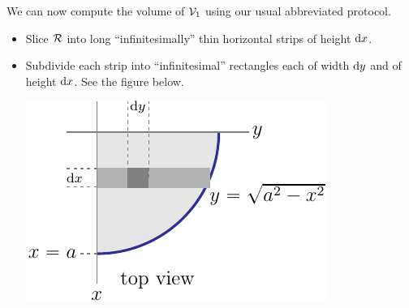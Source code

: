 \begin{eg}[Volume]
We can now compute the volume of $\mathcal{V}_1$ using our usual abbreviated
protocol.
\begin{itemize}
\item
   Slice $\mathcal{R}$ into long ``infinitesimally'' thin 
   horizontal strips of height $\mathrm{d}x$.
\item
   Subdivide each strip into ``infinitesimal'' rectangles each of 
   width $\mathrm{d}y$ and of height $\mathrm{d}x$. See the figure below.
\begin{efig}
\begin{center}
   \includegraphics{cylinderE.pdf}
\end{center}
\end{efig}


\end{itemize}
\end{eg}
